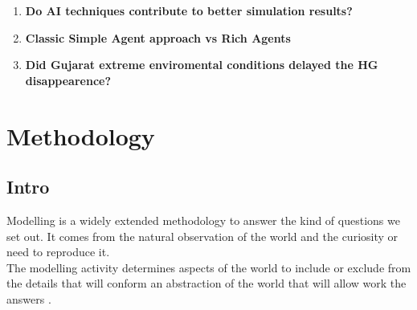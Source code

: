\documentclass[11pt,oneside,a4paper,openright]{report}
\begin{document}

\begin{enumerate}
 \item \indent \textbf{Do AI techniques contribute to better simulation results?}
 \item \indent \textbf{Classic Simple Agent approach vs Rich Agents}
 \item \indent \textbf{Did Gujarat extreme enviromental conditions delayed the HG disappearence?}
\end{enumerate}

\newpage 




\chapter{Methodology}



\section{Intro}





Modelling is a widely extended methodology to answer the kind of questions we set out. It comes from the natural observation of the world and the curiosity or need to reproduce it.\\
The modelling activity determines aspects of the world to include or exclude from the details that
will conform an abstraction of the world that will allow work the answers \cite{Robinson2008}.
\end{document}
